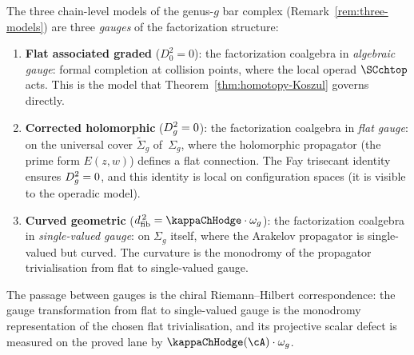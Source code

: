 \begin{corollary}
\label{cor:three-models-from-fact}
The three chain-level models of the genus-$g$ bar complex
\textup{(}Remark~\textup{\ref{rem:three-models})} are three
\emph{gauges} of the factorization structure:
\begin{enumerate}[label=\textup{(\roman*)}]
\item \textbf{Flat associated graded} ($D_0^2 = 0$): the
 factorization coalgebra in \emph{algebraic gauge}: formal
 completion at collision points, where the local operad
 $\SCchtop$ acts. This is the model that
 Theorem~\textup{\ref{thm:homotopy-Koszul}} governs directly.

\item \textbf{Corrected holomorphic} ($D_{g}^2 = 0$): the
 factorization coalgebra in \emph{flat gauge}: on the universal
 cover $\widetilde{\Sigma}_g$ of~$\Sigma_g$, where the holomorphic
 propagator (the prime form $E(z,w)$) defines a flat connection.
 The Fay trisecant identity ensures $D_{g}^2 = 0$, and this
 identity is local on configuration spaces (it is visible to the
 operadic model).

\item \textbf{Curved geometric} ($\dfib^{\,2} = \kappaChHodge \cdot
 \omega_g$): the factorization coalgebra in \emph{single-valued
 gauge}: on $\Sigma_g$ itself, where the Arakelov propagator
 is single-valued but curved. The curvature is the monodromy of
 the propagator trivialisation from flat to single-valued gauge.
\end{enumerate}
The passage between gauges is the chiral Riemann--Hilbert
correspondence: the gauge transformation from flat to single-valued
gauge is the monodromy representation of the chosen flat
trivialisation, and its projective scalar defect is measured on the
proved lane by $\kappaChHodge(\cA) \cdot \omega_g$.
\end{corollary}

